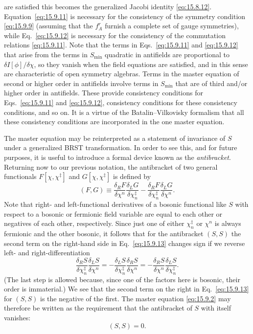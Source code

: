 are satisfied this becomes the generalized Jacobi identity
\eqref{eq:15.8.12}. Equation~\eqref{eq:15.9.11} is necessary for the
consistency of the symmetry condition \eqref{eq:15.9.9} (assuming that the
$f_A^r$ furnish a complete set of gauge symmetries), while
Eq.~\eqref{eq:15.9.12} is necessary for the consistency of the commutation
relations \eqref{eq:15.9.11}. Note that the terms in Eqs.~\eqref{eq:15.9.11}
and \eqref{eq:15.9.12} that arise from the terms in $S_{\min}$ quadratic in
antifields are proportional to $\delta I[\phi]/\delta\chi$, so they vanish when
the field equations are satisfied, and in this sense are characteristic of
open symmetry algebras. Terms in the master equation of second or higher order
in antifields involve terms in $S_{\min}$ that are of third and/or higher
order in antifields. These provide consistency conditions for
Eqs.~\eqref{eq:15.9.11} and \eqref{eq:15.9.12}, consistency conditions for
these consistency conditions, and so on. It is a virtue of the
Batalin--Vilkovisky formalism that all these consistency conditions are
incorporated in the one master equation.

The master equation may be reinterpreted as a statement of invariance of $S$
under a generalized BRST transformation. In order to see this, and for future
purposes, it is useful to introduce a formal device known as the
\emph{antibracket}. Returning now to our previous notation, the antibracket of
two general functionals $F[\chi,\chi^{\ddagger}]$ and
$G[\chi,\chi^{\ddagger}]$ is defined by
\begin{equation}
(F,G)\equiv
\frac{\delta_R F}{\delta\chi^n}\frac{\delta_L G}{\delta\chi_n^{\ddagger}}
-\frac{\delta_R F}{\delta\chi_n^{\ddagger}}\frac{\delta_L G}{\delta\chi^n}.
\tag{15.9.13}\label{eq:15.9.13}
\end{equation}
Note that right- and left-functional derivatives of a bosonic functional like
$S$ with respect to a bosonic or fermionic field variable are equal to each
other or negatives of each other, respectively. Since just one of either
$\chi_n^{\ddagger}$ or $\chi^n$ is always fermionic and the other bosonic, it
follows that for the antibracket $(S,S)$ the second term on the right-hand side
in Eq.~\eqref{eq:15.9.13} changes sign if we reverse left- and
right-differentiation
\[
\frac{\delta_R S}{\delta\chi_n^{\ddagger}}
\frac{\delta_L S}{\delta\chi^n}
=-\frac{\delta_L S}{\delta\chi_n^{\ddagger}}
\frac{\delta_R S}{\delta\chi^n}
=-\frac{\delta_R S}{\delta\chi^n}
\frac{\delta_L S}{\delta\chi_n^{\ddagger}}.
\]
(The last step is allowed because, since one of the factors here is bosonic,
their order is immaterial.) We see that the second term on the right in
Eq.~\eqref{eq:15.9.13} for $(S,S)$ is the negative of the first. The master
equation \eqref{eq:15.9.2} may therefore be written as the requirement that
the antibracket of $S$ with itself vanishes:
\begin{equation}
(S,S)=0.
\tag{15.9.14}\label{eq:15.9.14}
\end{equation}

